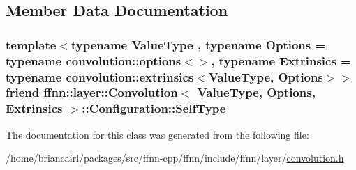 \subsection{Member Data Documentation}
\hypertarget{classffnn_1_1layer_1_1_convolution_1_1_configuration_aa57a5c918311d302244afcfced552871}{
\subsubsection[{Self\-Type}]{\setlength{\rightskip}{0pt plus 5cm}template$<$typename Value\-Type , typename Options  = typename convolution\-::options$<$$>$, typename Extrinsics  = typename convolution\-::extrinsics$<$\-Value\-Type, Options$>$$>$ friend {\bf ffnn\-::layer\-::\-Convolution}$<$ Value\-Type, Options, Extrinsics $>$\-::Configuration\-::\-Self\-Type}}\label{classffnn_1_1layer_1_1_convolution_1_1_configuration_aa57a5c918311d302244afcfced552871}


The documentation for this class was generated from the following file\-:\begin{DoxyCompactItemize}
\item 
/home/briancairl/packages/src/ffnn-\/cpp/ffnn/include/ffnn/layer/\hyperlink{convolution_8h}{convolution.\-h}\end{DoxyCompactItemize}
